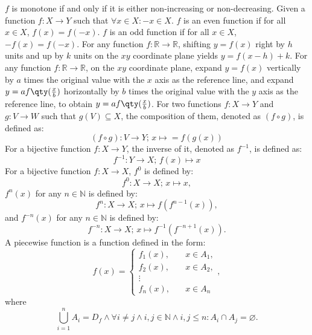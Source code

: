 \documentclass[a4paper,12pt]{report}
\begin{document}
$f$ is monotone if and only if it is either non-increasing or non-decreasing.
Given a function $f\colon X\to Y$ such that $\forall x\in X\colon -x\in X$.
$f$ is an even function if for all $x\in X$, $f(x)=f(-x)$.
$f$ is an odd function if for all $x\in X$, $-f(x)=f(-x)$.
For any function $f\colon\mathbb{R}\to\mathbb{R}$, shifting $y=f(x)$ right by $h$ units and up by $k$ units on the $xy$ coordinate plane yields $y=f(x-h)+k$.
For any function $f\colon\mathbb{R}\to\mathbb{R}$, on the $xy$ coordinate plane, expand $y=f(x)$ vertically by $a$ times the original value with the $x$ axis as the reference line, and expand $y=af\qty(\frac{x}{b})$ horizontally by $b$ times the original value with the $y$ axis as the reference line, to obtain $y=af\qty(\frac{x}{b})$.
For two functions $f\colon X\to Y$ and $g\colon V\to W$ such that $g(V)\subseteq X$, the composition of them, denoted as $(f\circ g)$, is defined as:
\[(f \circ g)\colon V\to Y;\,x\mapsto = f(g(x))\]
For a bijective function $f\colon X\to Y$, the inverse of it, denoted as $f^{-1}$, is defined as:
\[f^{-1}\colon Y\to X;\,f(x)\mapsto x\]
For a bijective function $f\colon X\to X$, $f^0$ is defined by:
\[f^0\colon X\to X;\,x\mapsto x,\]
$f^n(x)$ for any $n\in\mathbb{N}$ is defined by:
\[f^n\colon X\to X;\,x\mapsto f\left(f^{n-1}(x)\right),\]
and $f^{-n}(x)$ for any $n\in\mathbb{N}$ is defined by:
\[f^{-n}\colon X\to X;\,x\mapsto f^{-1}\left(f^{-n+1}(x)\right).\]
A piecewise function is a function defined in the form:
\[f(x) =
\begin{cases}
f_1(x), & \quad x\in A_1, \\
f_2(x), & \quad x\in A_2, \\
\vdots \\
f_n(x), & \quad x \in A_n
\end{cases},\]
where
\[\bigcup_{i=1}^nA_i=D_f\land\forall i\neq j\land i,j\in\mathbb{N}\land i,j\leq n\colon A_i\cap A_j=\varnothing.\]
\end{document}
